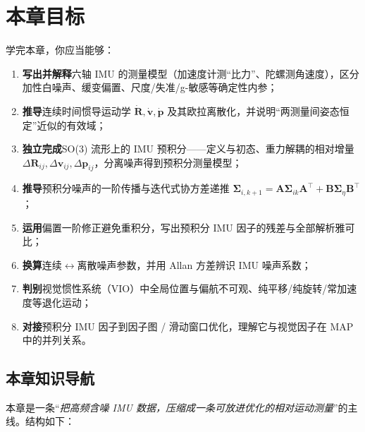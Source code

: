 \section*{本章目标}
学完本章，你应当能够：
\begin{enumerate}
  \item \textbf{写出并解释}六轴 IMU 的测量模型（加速度计测“比力”、陀螺测角速度），区分加性白噪声、缓变偏置、尺度/失准/g-敏感等确定性内参；
  \item \textbf{推导}连续时间惯导运动学 $\dot{\mathbf R},\dot{\mathbf v},\dot{\mathbf p}$ 及其欧拉离散化，并说明“两测量间姿态恒定”近似的有效域；
  \item \textbf{独立完成}SO(3) 流形上的 IMU 预积分——定义与初态、重力解耦的相对增量 $\Delta\mathbf R_{ij},\Delta\mathbf v_{ij},\Delta\mathbf p_{ij}$，分离噪声得到预积分测量模型；
  \item \textbf{推导}预积分噪声的一阶传播与迭代式协方差递推 $\boldsymbol\Sigma_{i,k+1}=\mathbf A\boldsymbol\Sigma_{ik}\mathbf A^\top+\mathbf B\boldsymbol\Sigma_\eta\mathbf B^\top$；
  \item \textbf{运用}偏置一阶修正避免重积分，写出预积分 IMU 因子的残差与全部解析雅可比；
  \item \textbf{换算}连续$\leftrightarrow$离散噪声参数，并用 Allan 方差辨识 IMU 噪声系数；
  \item \textbf{判别}视觉惯性系统（VIO）中全局位置与偏航不可观、纯平移/纯旋转/常加速度等退化运动；
  \item \textbf{对接}预积分 IMU 因子到因子图 / 滑动窗口优化，理解它与视觉因子在 MAP 中的并列关系。
\end{enumerate}

\subsection*{本章知识导航}
本章是一条“\emph{把高频含噪 IMU 数据，压缩成一条可放进优化的相对运动测量}”的主线。结构如下：

